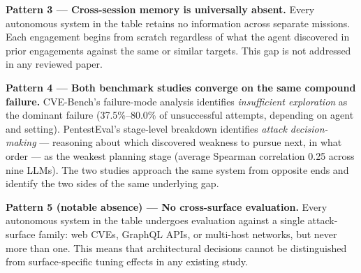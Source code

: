 \textbf{Pattern 3 --- Cross-session memory is universally absent.} Every autonomous system in the table retains no information across separate missions. Each engagement begins from scratch regardless of what the agent discovered in prior engagements against the same or similar targets. This gap is not addressed in any reviewed paper.

\textbf{Pattern 4 --- Both benchmark studies converge on the same compound failure.} CVE-Bench's failure-mode analysis identifies \emph{insufficient exploration} as the dominant failure (37.5\%--80.0\% of unsuccessful attempts, depending on agent and setting). PentestEval's stage-level breakdown identifies \emph{attack decision-making} --- reasoning about which discovered weakness to pursue next, in what order --- as the weakest planning stage (average Spearman correlation 0.25 across nine LLMs). The two studies approach the same system from opposite ends and identify the two sides of the same underlying gap.

\textbf{Pattern 5 (notable absence) --- No cross-surface evaluation.} Every autonomous system in the table undergoes evaluation against a single attack-surface family: web CVEs, GraphQL APIs, or multi-host networks, but never more than one. This means that architectural decisions cannot be distinguished from surface-specific tuning effects in any existing study.
